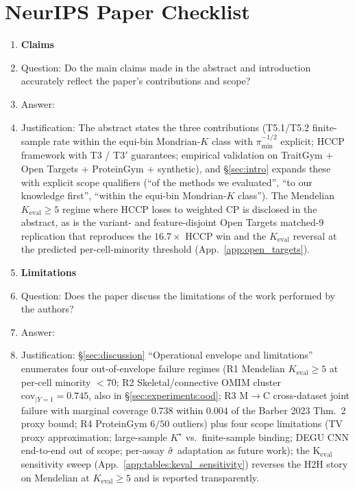 \section*{NeurIPS Paper Checklist}

\begin{enumerate}

\item {\bf Claims}
    \item[] Question: Do the main claims made in the abstract and introduction accurately reflect the paper's contributions and scope?
    \item[] Answer: \answerYes{}
    \item[] Justification: The abstract states the three contributions (T5.1/T5.2 finite-sample rate within the equi-bin Mondrian-$K$ class with $\pi_{\min}^{-1/2}$ explicit; HCCP framework with T3 / T3$'$ guarantees; empirical validation on TraitGym + Open Targets + ProteinGym + synthetic), and §\ref{sec:intro} expands these with explicit scope qualifiers (``of the methods we evaluated'', ``to our knowledge first'', ``within the equi-bin Mondrian-$K$ class''). The Mendelian $K_{\mathrm{eval}} \geq 5$ regime where HCCP loses to weighted CP is disclosed in the abstract, as is the variant- and feature-disjoint Open Targets matched-9 replication that reproduces the $16.7\times$ HCCP win and the $K_{\mathrm{eval}}$ reversal at the predicted per-cell-minority threshold (App.~\ref{app:open_targets}).

\item {\bf Limitations}
    \item[] Question: Does the paper discuss the limitations of the work performed by the authors?
    \item[] Answer: \answerYes{}
    \item[] Justification: §\ref{sec:discussion} ``Operational envelope and limitations'' enumerates four out-of-envelope failure regimes (R1 Mendelian $K_{\mathrm{eval}} \geq 5$ at per-cell minority $< 70$; R2 Skeletal/connective OMIM cluster $\mathrm{cov}_{|Y=1} = 0.745$, also in §\ref{sec:experiments:ood}; R3 M$\to$C cross-dataset joint failure with marginal coverage $0.738$ within $0.004$ of the Barber 2023 Thm.~2 proxy bound; R4 ProteinGym $6/50$ outliers) plus four scope limitations (TV proxy approximation; large-sample $K^\star$ vs.\ finite-sample binding; DEGU CNN end-to-end out of scope; per-assay $\hat{\sigma}$ adaptation as future work); the K$_{\mathrm{eval}}$ sensitivity sweep (App.~\ref{app:tables:keval_sensitivity}) reverses the H2H story on Mendelian at $K_{\mathrm{eval}} \geq 5$ and is reported transparently.


\end{enumerate}
